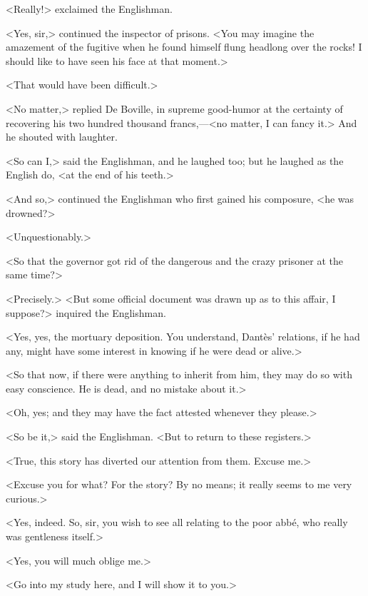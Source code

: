  <Really!> exclaimed the Englishman. 

 <Yes, sir,> continued the inspector of prisons. <You may imagine the amazement of the fugitive when he found himself flung headlong over the rocks! I should like to have seen his face at that moment.> 

 <That would have been difficult.> 

 <No matter,> replied De Boville, in supreme good-humor at the certainty of recovering his two hundred thousand francs,—<no matter, I can fancy it.> And he shouted with laughter. 

 <So can I,> said the Englishman, and he laughed too; but he laughed as the English do, <at the end of his teeth.> 

 <And so,> continued the Englishman who first gained his composure, <he was drowned?> 

 <Unquestionably.> 

 <So that the governor got rid of the dangerous and the crazy prisoner at the same time?> 

 <Precisely.>  <But some official document was drawn up as to this affair, I suppose?> inquired the Englishman. 

 <Yes, yes, the mortuary deposition. You understand, Dantès' relations, if he had any, might have some interest in knowing if he were dead or alive.> 

 <So that now, if there were anything to inherit from him, they may do so with easy conscience. He is dead, and no mistake about it.> 

 <Oh, yes; and they may have the fact attested whenever they please.> 

 <So be it,> said the Englishman. <But to return to these registers.> 

 <True, this story has diverted our attention from them. Excuse me.> 

 <Excuse you for what? For the story? By no means; it really seems to me very curious.> 

 <Yes, indeed. So, sir, you wish to see all relating to the poor abbé, who really was gentleness itself.> 

 <Yes, you will much oblige me.> 

 <Go into my study here, and I will show it to you.> 

